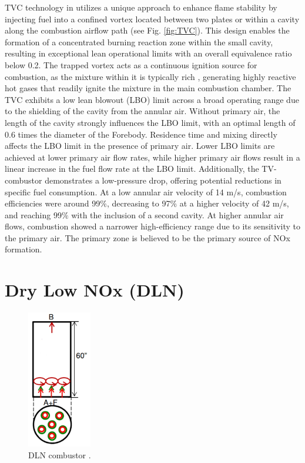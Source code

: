 TVC technology in \cite{TVC5266} utilizes a unique approach to enhance flame stability by injecting fuel into a confined vortex located between two plates or within a cavity along the combustion airflow path (see Fig. \ref{fig:TVC}). This design enables the formation of a concentrated burning reaction zone within the small cavity, resulting in exceptional lean operational limits with an overall equivalence ratio below 0.2. 
The trapped vortex acts as a continuous ignition source for combustion, as the mixture within it is typically rich \cite{RUTAR20002435}, generating highly reactive hot gases that readily ignite the mixture in the main combustion chamber.
The TVC exhibits a low lean blowout (LBO) limit across a broad operating range due to the shielding of the cavity from the annular air. Without primary air, the length of the cavity strongly influences the LBO limit, with an optimal length of 0.6 times the diameter of the Forebody. Residence time and mixing directly affects the LBO limit in the presence of primary air.
Lower LBO limits are achieved at lower primary air flow rates, while higher primary air flows result in a linear increase in the fuel flow rate at the LBO limit. Additionally, the TV-combustor demonstrates a low-pressure drop, offering potential reductions in specific fuel consumption. At a low annular air velocity of 14 m/s, combustion efficiencies were around 99$\%$, decreasing to 97$\%$ at a higher velocity of 42 m/s, and reaching 99$\%$ with the inclusion of a second cavity. At higher annular air flows, combustion showed a narrower high-efficiency range due to its sensitivity to the primary air. The primary zone is believed to be the primary source of NOx formation.

\newpage
\section{Dry Low NOx (DLN)}
\vspace{-5mm}
\begin{figure}
\vspace{-12mm}
    \centering    \includegraphics[width=0.25\textwidth]{Chapter2/Images/DLN.jpeg}
    \caption[DLN combustor]{DLN combustor \cite{SKG2017}.}
    \label{fig:DLN}
\end{figure}

